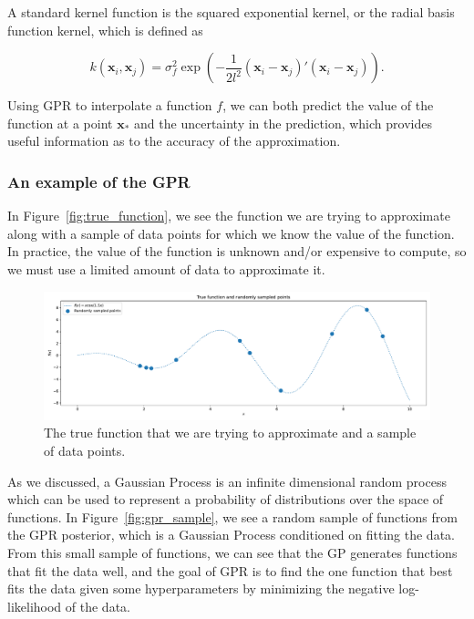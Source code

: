 A standard kernel function is the squared exponential kernel, or the radial basis function kernel, which is defined as

\begin{equation}
  k(\mathbf{x}_i, \mathbf{x}_j) = \sigma^2_f \exp\left(-\frac{1}{2l^2} (\mathbf{x}_i - \mathbf{x}_j)' (\mathbf{x}_i - \mathbf{x}_j)\right).
\end{equation}

Using GPR to interpolate a function $f$, we can both predict the value of the function at a point $\mathbf{x}_*$ and the uncertainty in the prediction, which provides useful information as to the accuracy of the approximation.

\subsubsection{An example of the GPR}

In Figure~\ref{fig:true_function}, we see the function we are trying to approximate along with a sample of data points for which we know the value of the function. In practice, the value of the function is unknown and/or expensive to compute, so we must use a limited amount of data to approximate it.

\begin{figure}
  \centering
  \includegraphics[width=\linewidth]{Figures/true_function.pdf}
  \caption{The true function that we are trying to approximate and a sample of data points.}
  \notinsubfile{\label{fig:true_function}}
\end{figure}

As we discussed, a Gaussian Process is an infinite dimensional random process which can be used to represent a probability of distributions over the space of functions. In Figure~\ref{fig:gpr_sample}, we see a random sample of functions from the GPR posterior, which is a Gaussian Process conditioned on fitting the data. From this small sample of functions, we can see that the GP generates functions that fit the data well, and the goal of GPR is to find the one function that best fits the data given some hyperparameters by minimizing the negative log-likelihood of the data.

